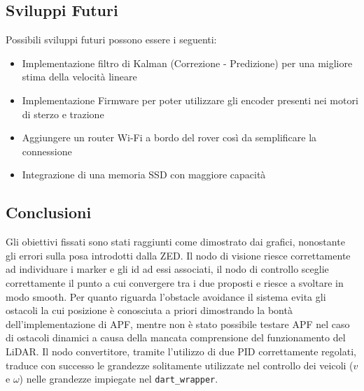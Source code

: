 \label{sec:concl}

\subsection{Sviluppi Futuri}
  Possibili sviluppi futuri possono essere i seguenti: 
  \begin{itemize}
    \item Implementazione filtro di Kalman (Correzione - Predizione) per una migliore stima della velocità lineare
    \item Implementazione Firmware per poter utilizzare gli encoder presenti nei motori di sterzo e trazione
    \item Aggiungere un router Wi-Fi a bordo del rover così da semplificare la connessione
    \item Integrazione di una memoria SSD con maggiore capacità
  \end{itemize}
  
\subsection{Conclusioni}
  Gli obiettivi fissati sono stati raggiunti come dimostrato dai grafici, nonostante gli errori sulla posa introdotti dalla ZED. Il nodo di visione riesce correttamente ad individuare i marker e gli id ad essi associati, il nodo di controllo sceglie correttamente il punto a cui convergere tra i due proposti  e riesce a svoltare in modo smooth.
  Per quanto riguarda l'obstacle avoidance il sistema evita gli ostacoli la cui posizione è conosciuta a priori dimostrando la bontà dell'implementazione di APF, mentre non è stato possibile testare APF nel caso di ostacoli dinamici a causa della mancata comprensione del funzionamento del LiDAR. Il nodo convertitore, tramite l'utilizzo di due PID correttamente regolati, traduce con successo le grandezze solitamente utilizzate nel controllo dei veicoli ($v$ e $\omega$) nelle grandezze impiegate nel \texttt{dart\_wrapper}. 
